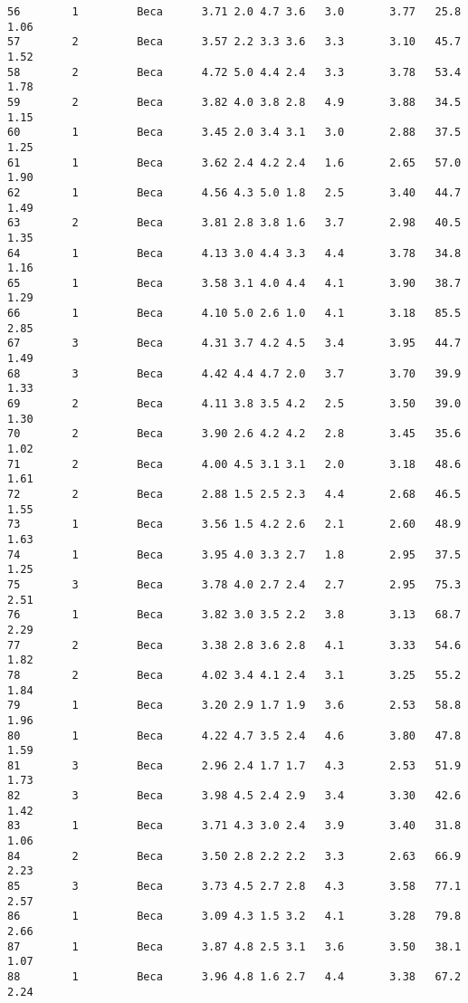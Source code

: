 \documentclass[
  letterpaper,
  DIV=11,
  numbers=noendperiod]{scrartcl}
\begin{document}
\begin{verbatim}
56        1         Beca      3.71 2.0 4.7 3.6   3.0       3.77   25.8    1.06
57        2         Beca      3.57 2.2 3.3 3.6   3.3       3.10   45.7    1.52
58        2         Beca      4.72 5.0 4.4 2.4   3.3       3.78   53.4    1.78
59        2         Beca      3.82 4.0 3.8 2.8   4.9       3.88   34.5    1.15
60        1         Beca      3.45 2.0 3.4 3.1   3.0       2.88   37.5    1.25
61        1         Beca      3.62 2.4 4.2 2.4   1.6       2.65   57.0    1.90
62        1         Beca      4.56 4.3 5.0 1.8   2.5       3.40   44.7    1.49
63        2         Beca      3.81 2.8 3.8 1.6   3.7       2.98   40.5    1.35
64        1         Beca      4.13 3.0 4.4 3.3   4.4       3.78   34.8    1.16
65        1         Beca      3.58 3.1 4.0 4.4   4.1       3.90   38.7    1.29
66        1         Beca      4.10 5.0 2.6 1.0   4.1       3.18   85.5    2.85
67        3         Beca      4.31 3.7 4.2 4.5   3.4       3.95   44.7    1.49
68        3         Beca      4.42 4.4 4.7 2.0   3.7       3.70   39.9    1.33
69        2         Beca      4.11 3.8 3.5 4.2   2.5       3.50   39.0    1.30
70        2         Beca      3.90 2.6 4.2 4.2   2.8       3.45   35.6    1.02
71        2         Beca      4.00 4.5 3.1 3.1   2.0       3.18   48.6    1.61
72        2         Beca      2.88 1.5 2.5 2.3   4.4       2.68   46.5    1.55
73        1         Beca      3.56 1.5 4.2 2.6   2.1       2.60   48.9    1.63
74        1         Beca      3.95 4.0 3.3 2.7   1.8       2.95   37.5    1.25
75        3         Beca      3.78 4.0 2.7 2.4   2.7       2.95   75.3    2.51
76        1         Beca      3.82 3.0 3.5 2.2   3.8       3.13   68.7    2.29
77        2         Beca      3.38 2.8 3.6 2.8   4.1       3.33   54.6    1.82
78        2         Beca      4.02 3.4 4.1 2.4   3.1       3.25   55.2    1.84
79        1         Beca      3.20 2.9 1.7 1.9   3.6       2.53   58.8    1.96
80        1         Beca      4.22 4.7 3.5 2.4   4.6       3.80   47.8    1.59
81        3         Beca      2.96 2.4 1.7 1.7   4.3       2.53   51.9    1.73
82        3         Beca      3.98 4.5 2.4 2.9   3.4       3.30   42.6    1.42
83        1         Beca      3.71 4.3 3.0 2.4   3.9       3.40   31.8    1.06
84        2         Beca      3.50 2.8 2.2 2.2   3.3       2.63   66.9    2.23
85        3         Beca      3.73 4.5 2.7 2.8   4.3       3.58   77.1    2.57
86        1         Beca      3.09 4.3 1.5 3.2   4.1       3.28   79.8    2.66
87        1         Beca      3.87 4.8 2.5 3.1   3.6       3.50   38.1    1.07
88        1         Beca      3.96 4.8 1.6 2.7   4.4       3.38   67.2    2.24

\end{verbatim}
\end{document}

